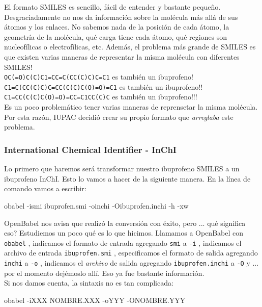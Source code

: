 \documentclass[10pt,letterpaper]{article}
\newcommand{\inlinecode}[1]{
\colorbox{light-gray}{\texttt{#1}}
}
\newenvironment{Code}
{
\begin{lrbox}{\selvestebox}%
\begin{minipage}{\dimexpr\columnwidth-2\fboxsep\relax}
\fontfamily{\ttdefault}\selectfont
}
{\end{minipage}\end{lrbox}%
\begin{center}
\colorbox{light-gray}{\usebox{\selvestebox}}
\end{center}
}
\begin{document}
El formato SMILES es sencillo, f\'acil de entender y bastante peque\~no. Desgraciadamente no nos da informaci\'on sobre la mol\'ecula m\'as all\'a de sus \'atomos y los enlaces. No sabemos nada de la posici\'on de cada \'atomo, la geometr\'ia de la mol\'ecula, qu\'e carga tiene cada \'atomo, qu\'e regiones son nucleof\'ilicas o electrof\'ilicas, etc. Adem\'as, el problema m\'as grande de SMILES es que existen varias maneras de representar la misma mol\'ecula con diferentes SMILES!\\

\noindent \inlinecode{OC(=O)C(C)C1=CC=C(CC(C)C)C=C1} es tambi\'en un ibuprofeno!\\
\inlinecode{C1=C(CC(C)C)C=CC(C(C)C(O)=O)=C1} es tambi\'en un ibuprofeno!!\\
\inlinecode{C1=CC(C(C)C(O)=O)=CC=C1CC(C)C} es tambi\'en un ibuprofeno!!!\\

Es un poco problem\'atico tener varias maneras de reprensetar la misma mol\'ecula. Por esta raz\'on, IUPAC decidi\'o crear su propio formato que \emph{arreglaba} este problema.

\subsubsection{International Chemical Identifier - InChI}
Lo primero que haremos ser\'a transformar nuestro ibuprofeno SMILES a un ibuprofeno InChI. Esto lo vamos a hacer de la siguiente manera. En la l\'inea de comando vamos a escribir:

\begin{Code}
obabel -ismi ibuprofen.smi -oinchi -Oibuprofen.inchi -h -xw
\end{Code}

OpenBabel nos avisa que realiz\'o la conversi\'on con \'exito, pero ... qu\'e significa eso? Estudiemos un poco qu\'e es lo que hicimos. Llamamos a OpenBabel con \inlinecode{obabel}, indicamos el formato de entrada agregando \inlinecode{smi} a \inlinecode{-i}, indicamos el archivo de entrada \inlinecode{ibuprofen.smi}, especificamos el formato de salida agregando \inlinecode{inchi} a \inlinecode{-o}, indicamos el \emph{archivo} de salida agregando \inlinecode{ibuprofen.inchi} a \inlinecode{-O} y ... por el momento dej\'emoslo all\'i. Eso ya fue bastante informaci\'on.\\

Si nos damos cuenta, la sintaxis no es tan complicada:

\begin{Code}
obabel -iXXX NOMBRE.XXX -oYYY -ONOMBRE.YYY
\end{Code}
\end{document}
